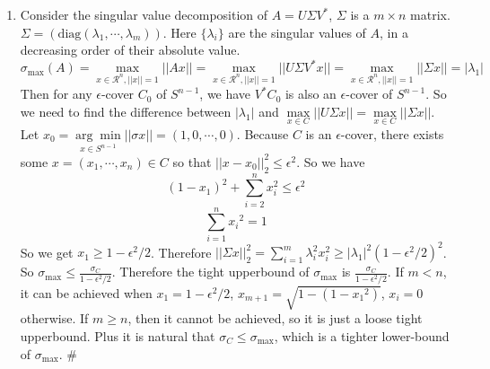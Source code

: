 \documentclass[twoside,11pt]{homework}
\begin{document}
\begin{enumerate}
    \item
    Consider the singular value decomposition of $A = U\Sigma V^*$, $\Sigma$ is a $m \times n$ matrix. $\Sigma = (\text{diag}(\lambda_1,\cdots,\lambda_m))$. Here $\{\lambda_i\}$ are the singular values of $A$, in a decreasing order of their absolute value. 
    $$\sigma_{\max} (A) = \underset{ x \in \mathcal{R}^n, ||x||=1}{\max}||Ax|| = \underset{ x \in \mathcal{R}^n, ||x||=1}{\max}||U \Sigma V^* x|| = \underset{ x \in \mathcal{R}^n, ||x||=1}{\max}||\Sigma x|| = |\lambda_1|$$
    Then for any $\epsilon$-cover $C_0$ of $S^{n-1}$, we have $V^* C_0$ is also an $\epsilon$-cover of $S^{n-1}$. So we need to find the difference between $|\lambda_1|$ and $ \underset{ x \in C}{\max}||U\Sigma x|| = \underset{ x \in C}{\max}||\Sigma x||$. Let $x_0 =  \underset{x \in S^{n-1}}{\arg\min} ||\sigma x|| = (1, 0,\cdots,0)$. Because $C$ is an $\epsilon$-cover, there exists some $x = (x_1, \cdots,x_n) \in C$ so that $||x-x_0||_2^2 \leq \epsilon ^2$. So we have
    $$(1-x_1)^2 + \sum_{i=2}^n x_i^2 \leq \epsilon ^2$$
    $$\sum_{i=1}^n {x_i}^2=1$$
    So we get $x_1 \geq 1-\epsilon^2/2$.
    Therefore $||\Sigma x||_2^2 = \sum_{i=1}^m \lambda_i^2 x_i^2 \geq |\lambda_1|^2(1-\epsilon^2/2)^2$.\newline
    So $\sigma_{\max} \leq \frac{\sigma_C}{1-\epsilon^2/2}$.
    Therefore the tight upperbound of $\sigma_{\max}$ is $\frac{\sigma_C}{1-\epsilon^2/2}$. If $m<n$, it can be achieved when $x_1=1-\epsilon^2/2$, $x_{m+1} = \sqrt{1-(1-{x_1}^2)}$,
    $x_i=0$ otherwise. If $m \geq n$, then it cannot be achieved, so it is just a loose tight upperbound.\newline
    Plus it is natural that $\sigma_C \leq \sigma_{\max}$, which is a tighter lower-bound of $\sigma_{\max}$. \#
    
    
    
    
    
\end{enumerate}
\end{document}
